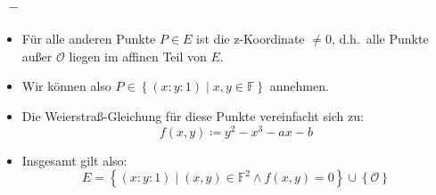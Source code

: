 \documentclass{beamer}
\theoremstyle{plain}
\theoremstyle{definition}
\theoremstyle{rem}
\newcommand{\patinf}{\mathcal{O}}
\begin{document}
\begin{frame}
\frametitle{\insertsection~--~\insertsubsection}
\begin{itemize}[<+->]
	\item Für alle anderen Punkte $P\in E$ ist die z-Koordinate $\ne 0$, d.h.\ alle Punkte außer $\patinf$ liegen im affinen Teil von $E$.
	\item Wir können also $P \in \left\{(x:y:1) \mid x,y \in \mathbb{F} \right\}$ annehmen.
	\item Die Weierstraß-Gleichung für diese Punkte vereinfacht sich zu:
	\begin{equation*}
    		f(x,y) \coloneqq y^2 - x^3 - ax - b
	\end{equation*}
	\item Insgesamt gilt also:
		\begin{equation*}
		E = \left\{(x:y:1) \mid (x,y) \in \mathbb{F}^2 \land f(x,y) = 0 \right\} \cup \left\{ \patinf \right\}
		\end{equation*}
\end{itemize}
\end{frame}

\end{document}
